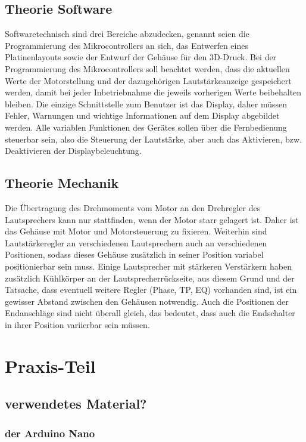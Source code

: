 \documentclass[11pt, titlepage, fleqn]{report}
\begin{document}
		\section{Theorie Software}
		\label{sec:Theorie Software}
			Softwaretechnisch sind drei Bereiche abzudecken, genannt seien die Programmierung des Mikrocontrollers an sich, das Entwerfen eines Platinenlayouts 
			sowie der Entwurf der Gehäuse für den 3D-Druck.
			Bei der Programmierung des Mikrocontrollers soll beachtet werden, dass die aktuellen Werte der Motorstellung und der dazugehörigen Lautstärkeanzeige
			gespeichert werden, damit bei jeder Inbetriebnahme die jeweils vorherigen Werte beibehalten bleiben. Die einzige Schnittstelle zum 
			Benutzer ist das Display, daher müssen Fehler, Warnungen und wichtige Informationen auf dem Display abgebildet werden. Alle variablen Funktionen des Gerätes 
			sollen über die Fernbedienung steuerbar sein, also die Steuerung der Lautstärke, aber auch das Aktivieren, bzw. Deaktivieren der Displaybeleuchtung.
		\section{Theorie Mechanik}
			Die Übertragung des Drehmoments vom Motor an den Drehregler des Lautsprechers kann nur stattfinden, wenn der Motor starr gelagert ist. Daher ist das Gehäuse 
			mit Motor und Motorsteuerung zu fixieren. Weiterhin sind Lautstärkeregler an verschiedenen Lautsprechern auch an verschiedenen Positionen, sodass dieses Gehäuse 
			zusätzlich in seiner Position variabel positionierbar sein muss. Einige Lautsprecher mit stärkeren Verstärkern haben zusätzlich Kühlkörper an der Lautsprecherrückseite, 
			aus diesem Grund und der Tatsache, dass eventuell weitere Regler (Phase, TP, EQ) vorhanden sind, ist ein gewisser Abstand zwischen den Gehäusen notwendig.
			Auch die Positionen der Endanschläge sind nicht überall gleich, das bedeutet, dass auch die Endschalter in ihrer Position variierbar sein müssen.
		\label{sec:Theorie Mecanik}
	\chapter{Praxis-Teil}
		\section{verwendetes Material?}
			\subsection{der Arduino Nano}
\end{document}
